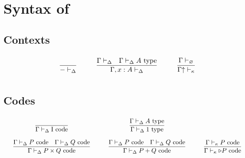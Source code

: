 \clearpage
\appendix

\section{Syntax of \GTT}
\newcommand{\type}{\text{ type}}
\newcommand{\poly}{\text{ code}}
\newcommand{\sub}{\text{ sub}}
\newcommand{\Nat}{\mathsf{Nat}}
\newcommand{\later}{\triangleright}
\newcommand{\suc}{\mathsf{S}}
\newcommand{\natrec}{\mathsf{natrec}}
\newcommand{\boxtm}{\mathsf{box}}
\newcommand{\unboxtm}{\mathsf{unbox}}
\newcommand{\fix}{\mathsf{fix}}
\newcommand{\next}{\mathsf{next}}
\newcommand{\force}{\mathsf{force}}
\newcommand{\up}{{\uparrow}}
\newcommand{\down}{{\downarrow}}
\newcommand{\idpoly}{\text{I}}
\newcommand{\cons}{\mathsf{cons}}
\newcommand{\primrec}{\mathsf{pimrec}}
\newcommand{\subid}{\mathsf{subid}}
\newcommand{\subpr}{\mathsf{subpr}}
\subsection*{Contexts}
\[\arraycolsep=15pt\def\arraystretch{2.8}
\begin{array}{ccc}
\infer{- \vdash_{\Delta}}{} 
&
\infer{\Gamma, x : A \vdash_{\Delta}}{\Gamma \vdash_{\Delta} & \Gamma \vdash_{\Delta} A \type}
&
\infer{\Gamma \up \vdash_{\kappa} }{\Gamma \vdash_{\varnothing}}
\end{array}
\]

\subsection*{Codes}
\[\arraycolsep=15pt\def\arraystretch{2.8}
\begin{array}{ccc}
\infer{\Gamma \vdash_{\Delta} \idpoly \poly}{} 
&
\infer{\Gamma \vdash_{\Delta} 1 \type}{\Gamma \vdash_{\Delta} A \type} 
\\
\infer{\Gamma \vdash_{\Delta} P \times Q \poly}{\Gamma \vdash_{\Delta} P \poly & \Gamma \vdash_{\Delta} Q \poly}
&
\infer{\Gamma \vdash_{\Delta} P + Q \poly}{\Gamma \vdash_{\Delta} P \poly & \Gamma \vdash_{\Delta} Q \poly}
&
\infer{\Gamma \vdash_{\kappa} \later P \poly}{\Gamma \vdash_{\kappa} P \poly}
\end{array}
\]

